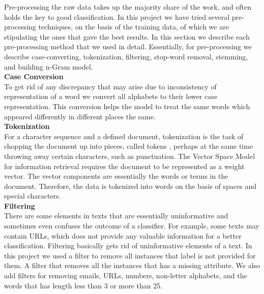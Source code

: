 \documentclass[letterpaper, 12pt]{article}
\begin{document}
Pre-processing the raw data takes up the majority share of the work, and often holds the key to good classification. In this project we have tried several pre-processing techniques, on the basis of the training data, of which we are stipulating the ones that gave the best results. In this section we describe each pre-processing method that we used in detail. Essentially, for pre-processing we describe case-converting, tokenization, filtering, stop-word removal, stemming, and building n-Gram model.\\


\vspace*{10pt}
\textbf{Case Conversion}\\

To get rid of any discrepancy that may arise due to inconsistency of representation of a word we convert all alphabets to their lower case representation. This conversion helps the model to treat the same words which appeared differently in different places the same.\\

\vspace*{10pt}
\textbf{Tokenization}\\


For a character sequence and a defined document, tokenization is the task of chopping the document up into pieces, called tokens , perhaps at the same time throwing away certain characters, such as punctuation. The Vector Space Model for information retrieval requires the document to be represented as a weight vector. The vector components are essentially the words or terms in the document. Therefore, the data is tokenized into words on the basis of spaces and special characters.\\

\vspace*{10pt}
\textbf{Filtering}\\


There are some elements in texts that are essentially uninformative and sometimes even confuses the outcome of a classifier. For example, some texts may contain URLs, which does not provide any valuable information for a better classification.   Filtering basically gets rid of uninformative elements of a text. In this project we used a filter to remove all instances that label is not provided for them. A filter that removes all the instances that has a missing attribute. We also add filters for removing emails, URLs, numbers, non-letter alphabets, and the words that has length less than 3 or more than 25.\\
\end{document}
